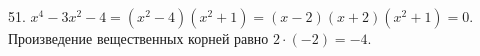 51. $x^4-3x^2-4=(x^2-4)(x^2+1)=(x-2)(x+2)(x^2+1)=0.$ Произведение вещественных корней равно $2\cdot(-2)=-4.$\\
